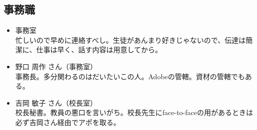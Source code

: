 \documentclass[dvipdfmx,jb5]{jreport}
\begin{document}
\subsection{事務職}
\begin{itemize}
      \item 事務室\\
            忙しいので早めに連絡すべし。生徒があんまり好きじゃないので、伝達は簡潔に、仕事は早く、話す内容は用意してから。
      \item 野口 周作 さん（事務室）\\
            事務長。多分関わるのはだいたいこの人。Adobeの管轄。資材の管轄でもある。
      \item 吉岡 敏子 さん（校長室）\\
            校長秘書。教員の悪口を言いがち。校長先生にface-to-faceの用があるときは必ず吉岡さん経由でアポを取る。
\end{itemize}
\end{document}
